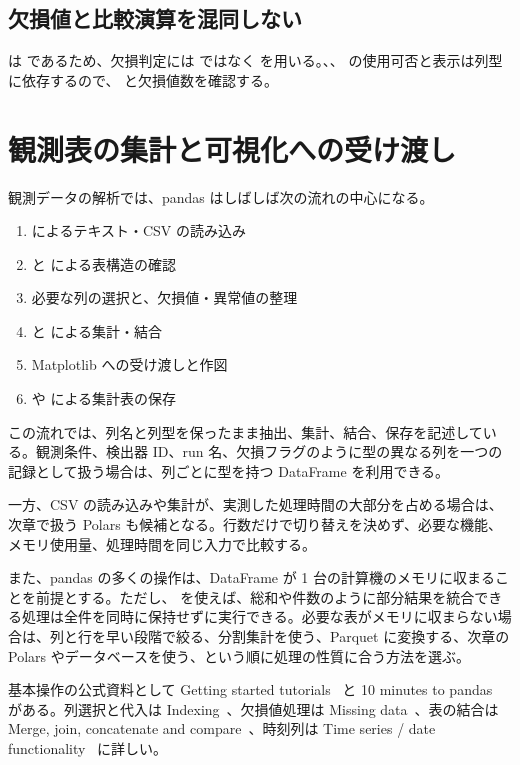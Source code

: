 \subsection{欠損値と比較演算を混同しない}

 は  であるため、欠損判定には \code{==} ではなく  を用いる。、、 の使用可否と表示は列型に依存するので、 と欠損値数を確認する。

\section{観測表の集計と可視化への受け渡し}

観測データの解析では、pandas はしばしば次の流れの中心になる。

\begin{enumerate}
\item {} によるテキスト・CSV の読み込み
\item {} と  による表構造の確認
\item 必要な列の選択と、欠損値・異常値の整理
\item {} と  による集計・結合
\item Matplotlib への受け渡しと作図
\item {} や  による集計表の保存
\end{enumerate}

この流れでは、列名と列型を保ったまま抽出、集計、結合、保存を記述している。観測条件、検出器 ID、run 名、欠損フラグのように型の異なる列を一つの記録として扱う場合は、列ごとに型を持つ DataFrame を利用できる。

一方、CSV の読み込みや集計が、実測した処理時間の大部分を占める場合は、次章で扱う Polars も候補となる。行数だけで切り替えを決めず、必要な機能、メモリ使用量、処理時間を同じ入力で比較する。

また、pandas の多くの操作は、DataFrame が 1 台の計算機のメモリに収まることを前提とする。ただし、 を使えば、総和や件数のように部分結果を統合できる処理は全件を同時に保持せずに実行できる。必要な表がメモリに収まらない場合は、列と行を早い段階で絞る、分割集計を使う、Parquet に変換する、次章の Polars やデータベースを使う、という順に処理の性質に合う方法を選ぶ。

基本操作の公式資料として Getting started tutorials~\cite{pandas_tutorials} と 10 minutes to pandas~\cite{pandas_10min} がある。列選択と代入は Indexing~\cite{pandas_indexing}、欠損値処理は Missing data~\cite{pandas_missing}、表の結合は Merge, join, concatenate and compare~\cite{pandas_merging}、時刻列は Time series / date functionality~\cite{pandas_timeseries} に詳しい。

